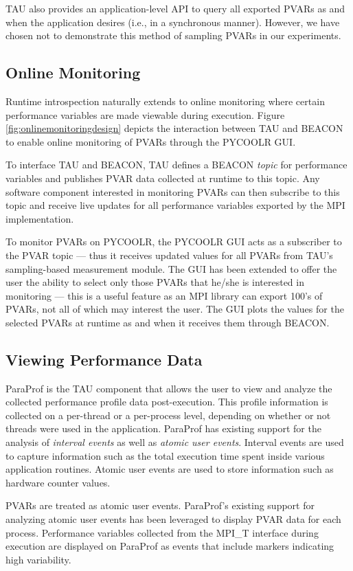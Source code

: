 \par TAU also provides an application-level API to query all exported PVARs as and when the application desires (i.e., in a synchronous manner). However, we have chosen not to demonstrate this method of sampling PVARs in our experiments.

\subsection{Online Monitoring}
Runtime introspection naturally extends to online monitoring where certain performance variables are made viewable during execution. Figure \ref{fig:onlinemonitoringdesign} depicts the interaction between TAU and BEACON to enable online monitoring of PVARs through the PYCOOLR GUI.
\par To interface TAU and BEACON, TAU defines a BEACON \textit{topic} for performance variables and publishes PVAR data collected at runtime to this topic. Any software component interested in monitoring PVARs can then subscribe to this topic and receive live updates for all performance variables exported by the MPI implementation.
\par To monitor PVARs on PYCOOLR, the PYCOOLR GUI acts as a subscriber to the PVAR topic --- thus it receives updated values for all PVARs from TAU's sampling-based measurement module. The GUI has been extended to offer the user the ability to select only those PVARs that he/she is interested in monitoring --- this is a useful feature as an MPI library can export 100's of PVARs, not all of which may interest the user. The GUI plots the values for the selected PVARs at runtime as and when it receives them through BEACON.

\subsection{Viewing Performance Data}
ParaProf is the TAU component that allows the user to view and analyze the collected performance profile data post-execution. This profile information is collected on a per-thread or a per-process level, depending on whether or not threads were used in the application. ParaProf has existing support for the analysis of \textit{interval events} as well as \textit{atomic user events}. Interval events are used to capture information such as the total execution time spent inside various application routines. Atomic user events are used to store information such as hardware counter values. 
\par PVARs are treated as atomic user events. ParaProf's existing support for analyzing atomic user events has been leveraged to display PVAR data for each process. Performance variables collected from the MPI\_T interface during execution are displayed on ParaProf as events that include markers indicating high variability.

